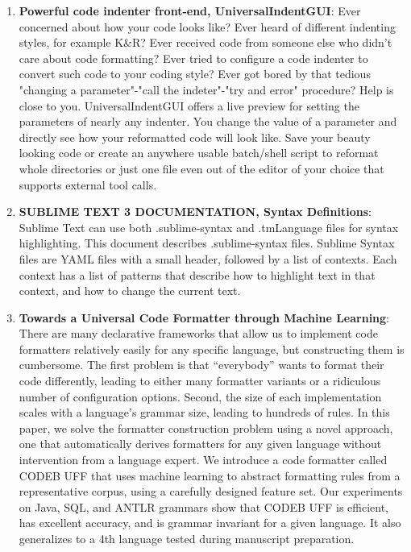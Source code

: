 \begin{englishtext}
\begin{enumerate}
    \item \textbf{Powerful code indenter front-end, UniversalIndentGUI}: Ever
    concerned about how your code looks like? Ever heard of different indenting
    styles, for example K\&R? Ever received code from someone else who didn't
    care about code formatting? Ever tried to configure a code indenter to
    convert such code to your coding style? Ever got bored by that tedious
    "changing a parameter"-"call the indeter"-"try and error" procedure? Help is
    close to you. UniversalIndentGUI offers a live preview for setting the
    parameters of nearly any indenter. You change the value of a parameter and
    directly see how your reformatted code will look like. Save your beauty
    looking code or create an anywhere usable batch/shell script to reformat
    whole directories or just one file even out of the editor of your choice
    that supports external tool calls.

    \item \textbf{SUBLIME TEXT 3 DOCUMENTATION, Syntax Definitions}: Sublime
    Text can use both .sublime-syntax and .tmLanguage files for syntax
    highlighting. This document describes .sublime-syntax files. Sublime Syntax
    files are YAML files with a small header, followed by a list of contexts.
    Each context has a list of patterns that describe how to highlight text in
    that context, and how to change the current text. \cite{Skinner}

    \item \textbf{Towards a Universal Code Formatter through Machine Learning}:
    There are many declarative frameworks that allow us to implement code
    formatters relatively easily for any specific language, but constructing
    them is cumbersome. The first problem is that “everybody” wants to format
    their code differently, leading to either many formatter variants or a
    ridiculous number of configuration options. Second, the size of each
    implementation scales with a language’s grammar size, leading to hundreds of
    rules. In this paper, we solve the formatter construction problem using a
    novel approach, one that automatically derives formatters for any given
    language without intervention from a language expert. We introduce a code
    formatter called CODEB UFF that uses machine learning to abstract formatting
    rules from a representative corpus, using a carefully designed feature set.
    Our experiments on Java, SQL, and ANTLR grammars show that CODEB UFF is
    efficient, has excellent accuracy, and is grammar invariant for a given
    language. It also generalizes to a 4th language tested during manuscript
    preparation. \cite{universalCodeFormatter}


\end{enumerate}
\end{englishtext}
